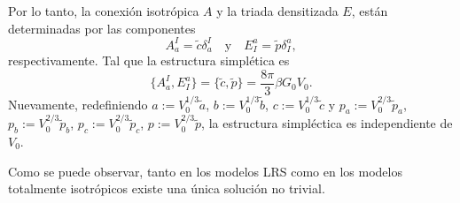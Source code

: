 Por lo tanto, la conexi\'{o}n isotr\'{o}pica $A$ y la triada densitizada $E$, est\'{a}n determinadas por las componentes
%
\begin{equation}
A^{I}_{a} = \tilde{c} \delta^{I}_{a} \quad \mathrm{y} \quad E^{a}_{I} = \tilde{p} \delta^{a}_{I},
\end{equation}
%
respectivamente. Tal que la estructura simpl\'{e}tica es
%
\begin{equation}
\{A^{I}_{a}, E^{a}_{I}\} = \{\tilde{c}, \tilde{p}\} = \frac{8 \pi}{3} \beta G_{0} V_{0}.
\end{equation}
%
Nuevamente, redefiniendo $a := V_{0}^{1/3} \tilde{a}$, $b := V_{0}^{1/3} \tilde{b}$, $c := V_{0}^{1/3} \tilde{c}$ y $p_{a} := V_{0}^{2/3} \tilde{p}_{a}$, $p_{b} := V_{0}^{2/3} \tilde{p}_{b}$, $p_{c} := V_{0}^{2/3} \tilde{p}_{c}$, $p := V_{0}^{2/3} \tilde{p}$, la estructura simpl\'{e}ctica es independiente de $V_{0}$.

Como se puede observar, tanto en los modelos LRS como en los modelos totalmente isotr\'{o}picos existe una \'{u}nica soluci\'{o}n no trivial.